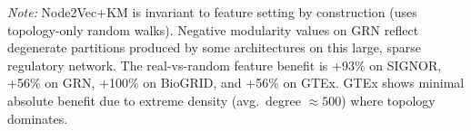 \vspace{4pt}
\noindent\textit{Note:} Node2Vec+KM is invariant to feature setting by construction (uses topology-only random walks). Negative modularity values on GRN reflect degenerate partitions produced by some architectures on this large, sparse regulatory network. The real-vs-random feature benefit is +93\% on SIGNOR, +56\% on GRN, +100\% on BioGRID, and +56\% on GTEx. GTEx shows minimal absolute benefit due to extreme density (avg.\ degree ${\approx}500$) where topology dominates.
